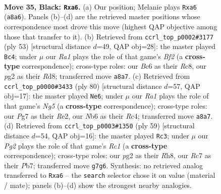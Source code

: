 \documentclass[11pt]{article}
\begin{document}
\clearpage

\begin{figure}[p]\centering
\begin{subfigure}{0.46\textwidth}\centering
\resizebox{\linewidth}{!}{%
\newchessgame
\chessboard[
  setfen={r4k2/2r2ppp/BnbN4/p3p1P1/8/1P2P1R1/P5PP/RN4K1 b - - 0 35},
  showmover=false,
  pgfstyle=straightmove, color=movearrow, markmove={a8-a6}
]}
\caption{}
\end{subfigure}\hfill
\begin{subfigure}{0.46\textwidth}\centering
\resizebox{\linewidth}{!}{%
\newchessgame
\chessboard[
  setfen={2rr2k1/pp3b2/8/6pN/P2Pp1Pp/4P2P/1n3P2/RN3RK1 b - - 1 27},
  showmover=false,
  pgfstyle=straightmove, color=movearrow, markmove={f7-c4}
]}
\caption{}
\end{subfigure}
\\[4pt]
\begin{subfigure}{0.46\textwidth}\centering
\resizebox{\linewidth}{!}{%
\newchessgame
\chessboard[
  setfen={3r2k1/bp1r3p/p5p1/3P1pNn/2R5/1P3KPP/P3R3/2B5 w - - 3 41},
  showmover=false,
  pgfstyle=straightmove, color=movearrow, markmove={g5-e6}
]}
\caption{}
\end{subfigure}\hfill
\begin{subfigure}{0.46\textwidth}\centering
\resizebox{\linewidth}{!}{%
\newchessgame
\chessboard[
  setfen={1kr4r/1p6/pb1pNp2/7p/bP2P2P/P4B2/2PR2P1/1K2R3 b - - 0 30},
  showmover=false,
  pgfstyle=straightmove, color=movearrow, markmove={c8-c3}
]}
\caption{}
\end{subfigure}
\caption{\textbf{Move 35, Black: \texttt{Rxa6}.} (a) Our position; Melanie plays \texttt{Rxa6} (\texttt{a8a6}). Panels (b)--(d) are the retrieved master positions whose correspondence most drove this move (highest QAP objective among those that transfer to it). (b) Retrieved from \texttt{ccrl\_top\_p0002\#3177} (ply 53) [structural distance $d$=49, QAP obj=28]: the master played \texttt{Bc4}; under $\mu$ our \emph{Ra1} plays the role of that game's \emph{Bf2} (a \textbf{cross-type} correspondence); cross-type roles: our \emph{B}c6 as their \emph{R}c8, our \emph{p}g2 as their \emph{R}d8; transferred move \texttt{a8a7}. (c) Retrieved from \texttt{ccrl\_top\_p0000\#3433} (ply 80) [structural distance $d$=57, QAP obj=17]: the master played \texttt{Ne6}; under $\mu$ our \emph{Ra1} plays the role of that game's \emph{Ng5} (a \textbf{cross-type} correspondence); cross-type roles: our \emph{P}g7 as their \emph{R}e2, our \emph{N}b6 as their \emph{R}c4; transferred move \texttt{a8a7}. (d) Retrieved from \texttt{ccrl\_top\_p0003\#1350} (ply 59) [structural distance $d$=54, QAP obj=16]: the master played \texttt{Rc3}; under $\mu$ our \emph{Pg2} plays the role of that game's \emph{Rc1} (a \textbf{cross-type} correspondence); cross-type roles: our \emph{p}g2 as their \emph{R}h8, our \emph{R}c7 as their \emph{P}b7; transferred move \texttt{g7g6}. Synthesis: no retrieved analog transferred to \texttt{Rxa6} -- the \texttt{search} selector chose it on value (material / mate); panels (b)--(d) show the strongest nearby analogies.}
\label{fig:thought-m69}
\end{figure}
\end{document}
